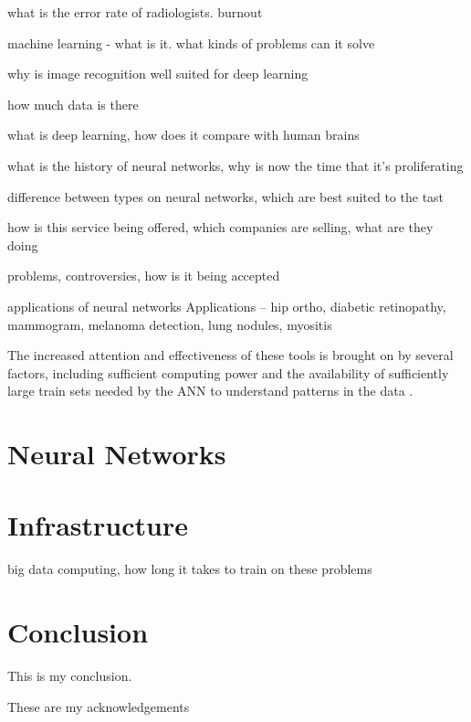 \documentclass[sigconf]{acmart}
\begin{document}
what is the error rate of radiologists. burnout

machine learning - what is it. what kinds of problems can it solve

why is image recognition well suited for deep learning

how much data is there

what is deep learning, how does it compare with human brains

what is the history of neural networks, why is now the time that it's proliferating

difference between types on neural networks, which are best suited to the tast

how is this service being offered, which companies are selling, what are they doing

problems, controversies, how is it being accepted

applications of neural networks Applications – hip ortho, diabetic retinopathy, mammogram, melanoma detection, lung nodules, myositis

The increased attention and effectiveness of these tools is brought on by several factors, including sufficient computing power and the availability of sufficiently large train sets needed by the ANN to understand patterns in the data \cite{editor00}.

\section{Neural Networks}

\section{Infrastructure}

big data computing, how long it takes to train on these problems

\section{Conclusion}

 This is my conclusion.

 
\begin{acks}

 These are my acknowledgements

\end{acks}



 


\appendix
 


\end{document}
